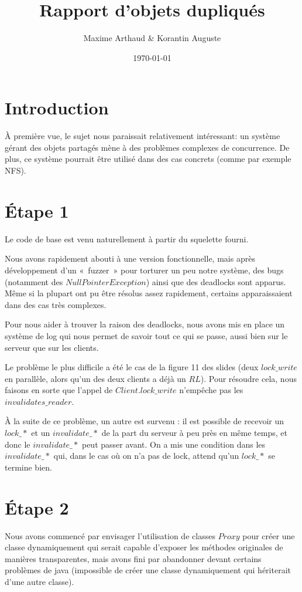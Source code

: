 \documentclass[11pt,a4paper]{article}
\title{Rapport d'objets dupliqués}
\author{Maxime Arthaud \& Korantin Auguste}
\date{\today}
\begin{document}
\maketitle

\section{Introduction}

À première vue, le sujet nous paraissait relativement intéressant: un système gérant des objets partagés mène à des
problèmes complexes de concurrence. De plus, ce système pourrait être utilisé dans des cas concrets (comme par exemple NFS).

\section{Étape 1}

Le code de base est venu naturellement à partir du squelette fourni.

Nous avons rapidement abouti à une version fonctionnelle, mais après développement d'un «~fuzzer~» pour torturer un peu notre système,
des bugs (notamment des $NullPointerException$) ainsi que des deadlocks sont apparus.
Même si la plupart ont pu être résolus assez rapidement, certains apparaissaient dans des cas très complexes.

Pour nous aider à trouver la raison des deadlocks, nous avons mis en place un système de log qui nous permet de savoir tout ce qui se passe,
aussi bien sur le serveur que sur les clients.

Le problème le plus difficile a été le cas de la figure 11 des slides (deux $lock\_write$ en parallèle, alors qu'un des deux clients a déjà un $RL$).
Pour résoudre cela, nous faisons en sorte que l'appel de $Client.lock\_write$ n'empêche pas les $invalidates\_reader$.

À la suite de ce problème, un autre est survenu : il est possible de recevoir un $lock\_*$ et un $invalidate\_*$ de la part du serveur à peu près
en même temps, et donc le $invalidate\_*$ peut passer avant. On a mis une condition dans les $invalidate\_*$ qui, dans le cas où on n'a pas de lock, attend
qu'un $lock\_*$ se termine bien.

\section{Étape 2}

Nous avons commencé par envisager l'utilisation de classes $Proxy$ pour créer une classe dynamiquement qui serait capable d'exposer
les méthodes originales de manières transparentes, mais avons fini par abandonner devant certains problèmes de java (impossible de créer une classe
dynamiquement qui hériterait d'une autre classe).
\end{document}
